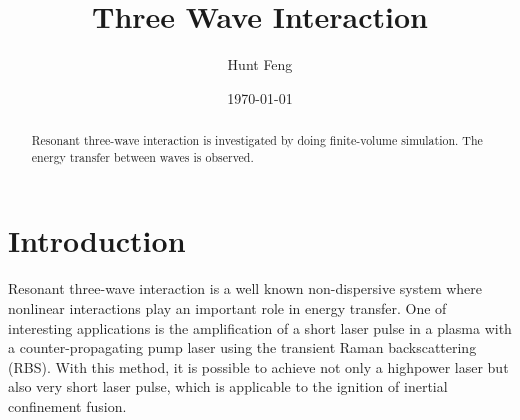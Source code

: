 \documentclass{article}
\title{Three Wave Interaction}
\author{Hunt Feng}
\date{\today}
\begin{document}
    \maketitle
    
    \begin{abstract}
        Resonant three-wave interaction is investigated by doing finite-volume simulation. The energy transfer between waves is observed.
    \end{abstract}

    \section{Introduction}
    Resonant three-wave interaction is a well known non-dispersive system where nonlinear interactions play an important role in energy transfer. One of interesting applications is the amplification of a short laser pulse in a plasma with a counter-propagating pump laser using the transient Raman backscattering (RBS). With this method, it is possible to achieve not only a highpower laser but also very short laser pulse, which is applicable to the ignition of inertial confinement fusion. \cite{kim_machine_2019}
\end{document}
